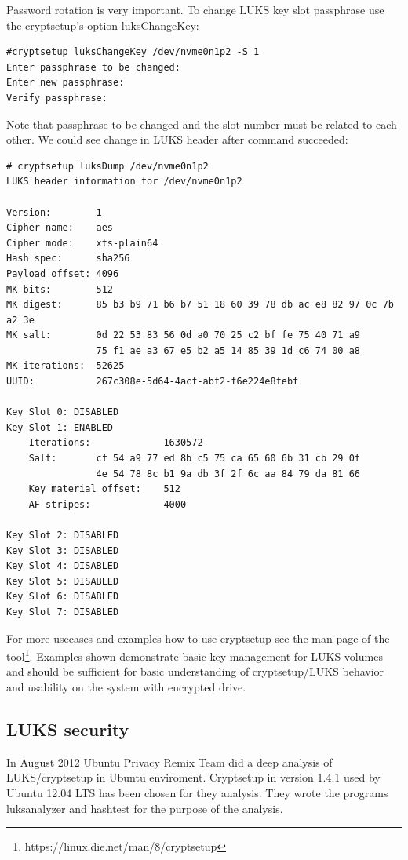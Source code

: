 Password rotation is very important.
To change LUKS key slot passphrase use the cryptsetup's option luksChangeKey:
\begin{lstlisting}[columns=fixed,basicstyle=\ttfamily\footnotesize,tabsize=4,backgroundcolor=\color{yellow!10}]
#cryptsetup luksChangeKey /dev/nvme0n1p2 -S 1
Enter passphrase to be changed:
Enter new passphrase:
Verify passphrase:
\end{lstlisting}
Note that passphrase to be changed and the slot number must be related to each other.
We could see change in LUKS header after command succeeded:
\begin{lstlisting}[columns=fixed,basicstyle=\ttfamily\footnotesize,tabsize=4,backgroundcolor=\color{yellow!10}]
# cryptsetup luksDump /dev/nvme0n1p2
LUKS header information for /dev/nvme0n1p2

Version:		1
Cipher name:	aes
Cipher mode:	xts-plain64
Hash spec:		sha256
Payload offset:	4096
MK bits:		512
MK digest:		85 b3 b9 71 b6 b7 51 18 60 39 78 db ac e8 82 97 0c 7b a2 3e
MK salt:		0d 22 53 83 56 0d a0 70 25 c2 bf fe 75 40 71 a9
				75 f1 ae a3 67 e5 b2 a5 14 85 39 1d c6 74 00 a8
MK iterations: 	52625
UUID:			267c308e-5d64-4acf-abf2-f6e224e8febf

Key Slot 0: DISABLED
Key Slot 1: ENABLED
	Iterations:				1630572
	Salt:		cf 54 a9 77 ed 8b c5 75 ca 65 60 6b 31 cb 29 0f
				4e 54 78 8c b1 9a db 3f 2f 6c aa 84 79 da 81 66
	Key material offset:	512
	AF stripes:				4000

Key Slot 2: DISABLED
Key Slot 3: DISABLED
Key Slot 4: DISABLED
Key Slot 5: DISABLED
Key Slot 6: DISABLED
Key Slot 7: DISABLED
\end{lstlisting}
For more usecases and examples how to use cryptsetup see the man page of the tool\footnote{https://linux.die.net/man/8/cryptsetup}.
Examples shown demonstrate basic key management for LUKS volumes and should be sufficient for basic understanding of cryptsetup/LUKS behavior and usability on the system with encrypted drive.

\subsection{LUKS security}

In August 2012 Ubuntu Privacy Remix Team did a deep analysis of LUKS/cryptsetup in Ubuntu enviroment.
Cryptsetup in version 1.4.1 used by Ubuntu 12.04 LTS has been chosen for they analysis.
They wrote the programs luksanalyzer and hashtest for the purpose of the analysis.

